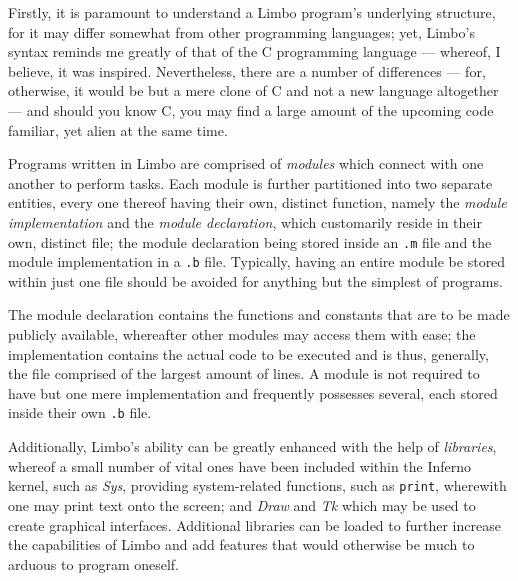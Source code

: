 \documentclass[a5paper,twoside,12pt]{report}
\begin{document}
Firstly, it is paramount to understand a Limbo program's underlying structure, for it may differ somewhat from other programming languages; yet, Limbo's syntax reminds me greatly of that of the C programming language — whereof, I believe, it was inspired. Nevertheless, there are a number of differences — for, otherwise, it would be but a mere clone of C and not a new language altogether — and should you know C, you may find a large amount of the upcoming code familiar, yet alien at the same time.

Programs written in Limbo are comprised of \textit{modules} which connect with one another to perform tasks. Each module is further partitioned into two separate entities, every one thereof having their own, distinct function, namely the \textit{module implementation} and the \textit{module declaration}, which customarily reside in their own, distinct file; the module declaration being stored inside an \texttt{.m} file and the module implementation in a \texttt{.b} file. Typically, having an entire module be stored within just one file should be avoided for anything but the simplest of programs. 

The module declaration contains the functions and constants that are to be made publicly available, whereafter other modules may access them with ease; the implementation contains the actual code to be executed and is thus, generally, the file comprised of the largest amount of lines. A module is not required to have but one mere implementation and frequently possesses several, each stored inside their own \texttt{.b} file.

Additionally, Limbo's ability can be greatly enhanced with the help of \textit{libraries}, whereof a small number of vital ones have been included within the Inferno kernel, such as \textit{Sys}, providing system-related functions, such as \texttt{print}, wherewith one may print text onto the screen; and \textit{Draw} and \textit{Tk} which may be used to create graphical interfaces. Additional libraries can be loaded to further increase the capabilities of Limbo and add features that would otherwise be much to arduous to program oneself.
\end{document}
